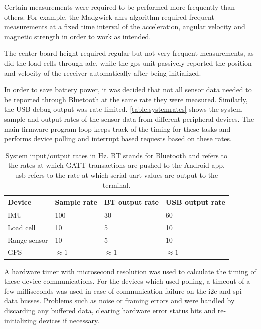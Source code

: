 Certain measurements were required to be performed more frequently than others. For example, the Madgwick \gls{ahrs} algorithm required frequent measurements at a fixed time interval of the acceleration, angular velocity and magnetic strength in order to work as intended.

The center board height required regular but not very frequent measurements, as did the load cells through \gls{adc}, while the \gls{gps} unit passively reported the position and velocity of the receiver automatically after being initialized.

In order to save battery power, it was decided that not all sensor data needed to be reported through Bluetooth at the same rate they were measured. Similarly, the USB debug output was rate limited. \autoref{table:systemrates} shows the system sample and output rates of the sensor data from different peripheral devices. The main firmware program loop keeps track of the timing for these tasks and performs device polling and interrupt based requests based on these rates.

\begin{table}[H]
\centering
\begin{tabular}{ l | l | l | l }
  Device 	& Sample rate & BT output rate 	& USB output rate\\
  \hline
  IMU 		& 100 		& 30 			& 60\\
  Load cell 	& 10 		& 5 			& 10\\
  Range sensor & 10 	& 5 			& 10\\
  GPS 		& $\approx 1$ & $\approx 1$ 	& $\approx 1$\\
\end{tabular}
\caption{System input/output rates in Hz. BT stands for Bluetooth and refers to the rates at which GATT transactions are pushed to the Android app. \gls{usb} refers to the rate at which serial \gls{uart} values are output to the terminal.}
\label{table:systemrates}
\end{table}

A hardware timer with microsecond resolution was used to calculate the timing of these device communications. For the devices which used polling, a timeout of a few milliseconds was used in case of communication failure on the \gls{i2c} and \gls{spi} data busses. Problems such as noise or framing errors and were handled by discarding any buffered data, clearing hardware error status bits and re-initializing devices if necessary.
